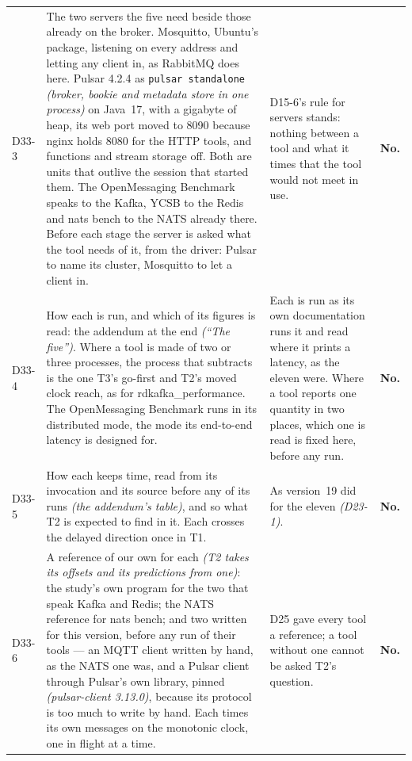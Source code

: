 \documentclass[11pt]{article}
\newcommand{\gl}[1]{{\color{soft}\itshape\small (#1)}}
\begin{document}
{\begin{longtable}{@{}p{1.1cm} >{\raggedright\arraybackslash}p{6.1cm} >{\raggedright\arraybackslash}p{6.0cm} >{\raggedright\arraybackslash}p{2.2cm}@{}}
D33-3 & The two servers the five need beside those already on the broker. Mosquitto, Ubuntu's package, listening on every address and letting any client in, as RabbitMQ does here. Pulsar 4.2.4 as \texttt{pulsar standalone} \gl{broker, bookie and metadata store in one process} on Java~17, with a gigabyte of heap, its web port moved to 8090 because nginx holds 8080 for the HTTP tools, and functions and stream storage off. Both are units that outlive the session that started them. The OpenMessaging Benchmark speaks to the Kafka, YCSB to the Redis and nats bench to the NATS already there. Before each stage the server is asked what the tool needs of it, from the driver: Pulsar to name its cluster, Mosquitto to let a client in. & D15-6's rule for servers stands: nothing between a tool and what it times that the tool would not meet in use. & \textbf{No.} \\
D33-4 & How each is run, and which of its figures is read: the addendum at the end \gl{``The five''}. Where a tool is made of two or three processes, the process that subtracts is the one T3's go-first and T2's moved clock reach, as for rdkafka\_performance. The OpenMessaging Benchmark runs in its distributed mode, the mode its end-to-end latency is designed for. & Each is run as its own documentation runs it and read where it prints a latency, as the eleven were. Where a tool reports one quantity in two places, which one is read is fixed here, before any run. & \textbf{No.} \\
D33-5 & How each keeps time, read from its invocation and its source before any of its runs \gl{the addendum's table}, and so what T2 is expected to find in it. Each crosses the delayed direction once in T1. & As version~19 did for the eleven \gl{D23-1}. & \textbf{No.} \\
D33-6 & A reference of our own for each \gl{T2 takes its offsets and its predictions from one}: the study's own program for the two that speak Kafka and Redis; the NATS reference for nats bench; and two written for this version, before any run of their tools --- an MQTT client written by hand, as the NATS one was, and a Pulsar client through Pulsar's own library, pinned \gl{pulsar-client 3.13.0}, because its protocol is too much to write by hand. Each times its own messages on the monotonic clock, one in flight at a time. & D25 gave every tool a reference; a tool without one cannot be asked T2's question. & \textbf{No.} \\

\end{longtable}}
\end{document}
